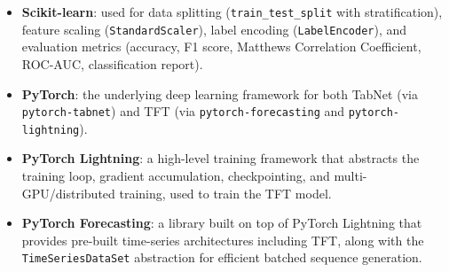 \documentclass[../main.tex]{subfiles}
\begin{document}
\begin{itemize}
    \item \textbf{Scikit-learn}: used for data
          splitting (\texttt{train\_test\_split} with stratification), feature
          scaling (\texttt{StandardScaler}), label encoding
          (\texttt{LabelEncoder}), and evaluation metrics (accuracy, F1 score,
          Matthews Correlation Coefficient, ROC-AUC, classification report).
    \item \textbf{PyTorch}: the underlying deep
          learning framework for both TabNet (via \texttt{pytorch-tabnet}) and
          TFT (via \texttt{pytorch-forecasting} and
          \texttt{pytorch-lightning}).
    \item \textbf{PyTorch Lightning}: a high-level
          training framework that abstracts the training loop, gradient
          accumulation, checkpointing, and multi-GPU/distributed training,
          used to train the TFT model.
    \item \textbf{PyTorch Forecasting}:
          a library built on top of PyTorch Lightning that provides pre-built
          time-series architectures including TFT, along with the
          \texttt{TimeSeriesDataSet} abstraction for efficient batched
          sequence generation.
\end{itemize}
\end{document}
